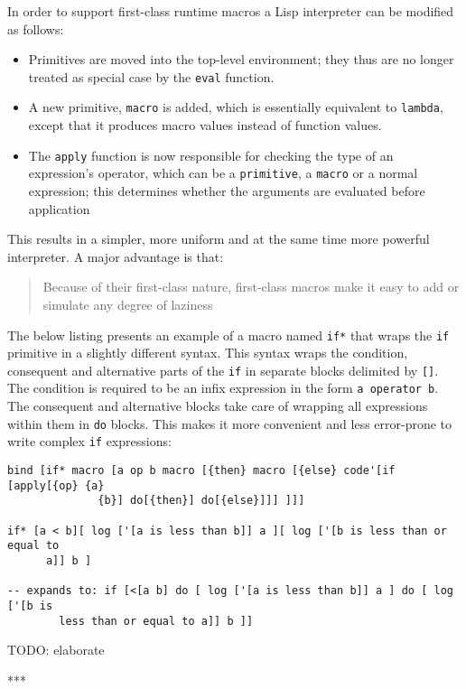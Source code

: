 In order to support first-class runtime macros a Lisp interpreter can be
modified as follows\cite{macros}:
\begin{itemize}
	\item Primitives are moved into the top-level environment; they thus are
          no longer treated as special case by the \texttt{eval} function.
	\item A new primitive, \texttt{macro} is added, which is essentially
          equivalent to \texttt{lambda}, except that it produces macro values
          instead of function values.
	\item The \texttt{apply} function is now responsible for checking the
          type of an expression's operator, which can be a \texttt{primitive}, a
          \texttt{macro} or a normal expression; this determines whether the
          arguments are evaluated before application
\end{itemize}

This results in a simpler, more uniform and at the same time more powerful
interpreter. A major advantage is that:
\begin{quote}
Because of their first-class nature, first-class macros make it easy to add or
simulate any degree of laziness\cite{macros}
\end{quote}

The below listing presents an example of a macro named \texttt{if*} that wraps
the \texttt{if} primitive in a slightly different syntax. This syntax wraps the
condition, consequent and alternative parts of the \texttt{if} in separate
blocks delimited by \texttt{[]}. The condition is required to be an infix
expression in the form \texttt{a operator b}. The consequent and alternative
blocks take care of wrapping all expressions within them in \texttt{do}
blocks. This makes it more convenient and less error-prone to write complex
\texttt{if} expressions:
\begin{lstlisting}
bind [if* macro [a op b macro [{then} macro [{else} code'[if [apply[{op} {a}
              {b}] do[{then}] do[{else}]]] ]]]

if* [a < b][ log ['[a is less than b]] a ][ log ['[b is less than or equal to
      a]] b ]

-- expands to: if [<[a b] do [ log ['[a is less than b]] a ] do [ log ['[b is
        less than or equal to a]] b ]]
\end{lstlisting}

TODO: elaborate

***

